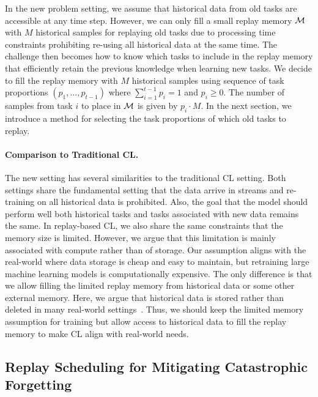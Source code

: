 In the new problem setting, we assume that historical data from old tasks are accessible at any time step. However, we can only fill a small replay memory ${\mathcal{M}}$ with $M$ historical samples for replaying old tasks due to processing time constraints prohibiting re-using all historical data at the same time. The challenge then becomes how to know which tasks to include in the replay memory that efficiently retain the previous knowledge when learning new tasks. We decide to fill the replay memory with $M$ historical samples using sequence of task proportions $(p_1, \dots, p_{t-1})$ where $\sum_{i=1}^{t-1} p_i = 1$ and $p_{i} \geq 0$. The number of samples from task $i$ to place in ${\mathcal{M}}$ is given by $p_i \cdot M$. In the next section, we introduce a method for selecting the task proportions of which old tasks to replay. 


\paragraph{Comparison to Traditional CL.} The new setting has several similarities to the traditional CL setting. Both settings share the fundamental setting that the data arrive in streams and re-training on all historical data is prohibited. Also, the goal that the model should perform well both historical tasks and tasks associated with new data remains the same. In replay-based CL, we also share the same constraints that the memory size is limited. However, we argue that this limitation is mainly associated with compute rather than of storage. Our assumption aligns with the real-world where data storage is cheap and easy to maintain, but retraining large machine learning models is computationally expensive. The only difference is that we allow filling the limited replay memory from historical data or some other external memory. Here, we argue that historical data is stored rather than deleted in many real-world settings~\cite{bailis2017macrobase}. Thus, we should keep the limited memory assumption for training but allow access to historical data to fill the replay memory to make CL align with real-world needs.



\subsection{Replay Scheduling for Mitigating Catastrophic Forgetting}

